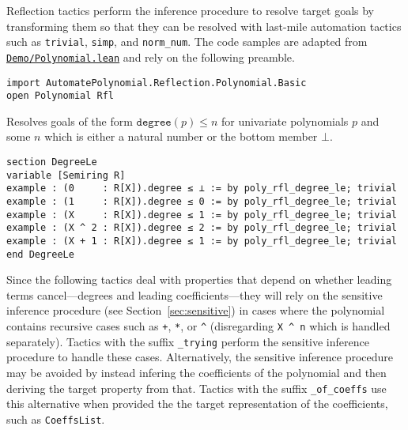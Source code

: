 
Reflection tactics perform the inference procedure to resolve target goals by transforming them so that they can be resolved with last-mile automation tactics such as \lstinline{trivial}, \lstinline{simp}, and \lstinline{norm_num}. The code samples are adapted from \href{https://github.com/LiamSchilling/AutomatePolynomial/tree/master/AutomatePolynomial/Demo/Polynomial.lean}{\texttt{Demo/Polynomial.lean}} and rely on the following preamble.

\begin{lstlisting}
import AutomatePolynomial.Reflection.Polynomial.Basic
open Polynomial Rfl
\end{lstlisting}

\begin{tactic}
\label{tac:poly_rfl_degree_le}
\leanok
{}
Resolves goals of the form $\mathtt{degree}(p) \leq n$ for univariate polynomials $p$ and some $n$ which is either a natural number or the bottom member $\bot$.
\begin{lstlisting}
section DegreeLe
variable [Semiring R]
example : (0     : R[X]).degree ≤ ⊥ := by poly_rfl_degree_le; trivial
example : (1     : R[X]).degree ≤ 0 := by poly_rfl_degree_le; trivial
example : (X     : R[X]).degree ≤ 1 := by poly_rfl_degree_le; trivial
example : (X ^ 2 : R[X]).degree ≤ 2 := by poly_rfl_degree_le; trivial
example : (X + 1 : R[X]).degree ≤ 1 := by poly_rfl_degree_le; trivial
end DegreeLe
\end{lstlisting}
\end{tactic}

Since the following tactics deal with properties that depend on whether leading terms cancel---degrees and leading coefficients---they will rely on the sensitive inference procedure (see Section~\ref{sec:sensitive}) in cases where the polynomial contains recursive cases such as \lstinline{+}, \lstinline{*}, or \lstinline{^} (disregarding \lstinline{X ^ n} which is handled separately). Tactics with the suffix \lstinline{_trying} perform the sensitive inference procedure to handle these cases. Alternatively, the sensitive inference procedure may be avoided by instead infering the coefficients of the polynomial and then deriving the target property from that. Tactics with the suffix \lstinline{_of_coeffs} use this alternative when provided the the target representation of the coefficients, such as \lstinline{CoeffsList}.

